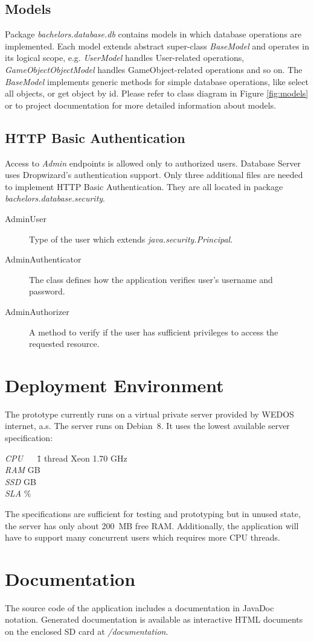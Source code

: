\subsection{Models}
Package \textit{bachelors.database.db} contains models in which database operations are implemented. Each model extends abstract super-class \textit{BaseModel} and operates in its logical scope, e.g. \textit{UserModel} handles User-related operations, \textit{GameObjectObjectModel} handles GameObject-related operations and so on. The \textit{BaseModel} implements generic methods for simple database operations, like select all objects, or get object by id. Please refer to class diagram in Figure \ref{fig:models} or to project documentation for more detailed information about models.

\subsection{HTTP Basic Authentication} 
Access to \textit{Admin} endpoints is allowed only to authorized users. Database Server uses Dropwizard's authentication support. Only three additional files are needed to implement HTTP Basic Authentication. They are all located in package \textit{bachelors.database.security}. 
\begin{description}
	\item[AdminUser] Type of the user which extends \textit{java.security.Principal}.
	\item[AdminAuthenticator] The class defines how the application verifies user's username and password.
	\item[AdminAuthorizer] A method to verify if the user has sufficient privileges to access the requested resource.
\end{description}

\section{Deployment Environment}
\label{section:deploy}
The prototype currently runs on a virtual private server provided by WEDOS internet, a.s. The server runs on Debian~8. It uses the lowest available server specification:
\begin{tabbing}
	\textit{CPU} ~~ \= 1 thread Xeon 1.70 GHz\\
	\textit{RAM}  GB\\
	\textit{SSD}  GB\\
	\textit{SLA} \%
\end{tabbing}

The specifications are sufficient for testing and prototyping but in unused state, the server has only about 200~MB free RAM. Additionally, the application will have to support many concurrent users which requires more CPU threads.  

\section{Documentation}
The source code of the application includes a documentation in JavaDoc notation. Generated documentation is available as interactive HTML documents on the enclosed SD card at \textit{/documentation}.